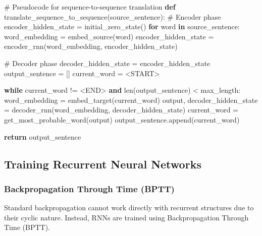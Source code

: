 \documentclass[
  letterpaper,
  DIV=11,
  numbers=noendperiod]{scrreprt}
\newenvironment{Shaded}{\begin{snugshade}}{\end{snugshade}}
\newcommand{\BuiltInTok}[1]{\textcolor[rgb]{0.00,0.23,0.31}{#1}}
\newcommand{\CommentTok}[1]{\textcolor[rgb]{0.37,0.37,0.37}{#1}}
\newcommand{\ControlFlowTok}[1]{\textcolor[rgb]{0.00,0.23,0.31}{\textbf{#1}}}
\newcommand{\KeywordTok}[1]{\textcolor[rgb]{0.00,0.23,0.31}{\textbf{#1}}}
\newcommand{\NormalTok}[1]{\textcolor[rgb]{0.00,0.23,0.31}{#1}}
\newcommand{\OperatorTok}[1]{\textcolor[rgb]{0.37,0.37,0.37}{#1}}
\newcommand{\StringTok}[1]{\textcolor[rgb]{0.13,0.47,0.30}{#1}}
\begin{document}
\begin{Shaded}
\begin{Highlighting}[]
\CommentTok{\# Pseudocode for sequence{-}to{-}sequence translation}
\KeywordTok{def}\NormalTok{ translate\_sequence\_to\_sequence(source\_sentence):}
    \CommentTok{\# Encoder phase}
\NormalTok{    encoder\_hidden\_state }\OperatorTok{=}\NormalTok{ initial\_zero\_state()}
    \ControlFlowTok{for}\NormalTok{ word }\KeywordTok{in}\NormalTok{ source\_sentence:}
\NormalTok{        word\_embedding }\OperatorTok{=}\NormalTok{ embed\_source(word)}
\NormalTok{        encoder\_hidden\_state }\OperatorTok{=}\NormalTok{ encoder\_rnn(word\_embedding, encoder\_hidden\_state)}
    
    \CommentTok{\# Decoder phase}
\NormalTok{    decoder\_hidden\_state }\OperatorTok{=}\NormalTok{ encoder\_hidden\_state}
\NormalTok{    output\_sentence }\OperatorTok{=}\NormalTok{ []}
\NormalTok{    current\_word }\OperatorTok{=} \StringTok{\textquotesingle{}\textless{}START\textgreater{}\textquotesingle{}}
    
    \ControlFlowTok{while}\NormalTok{ current\_word }\OperatorTok{!=} \StringTok{\textquotesingle{}\textless{}END\textgreater{}\textquotesingle{}} \KeywordTok{and} \BuiltInTok{len}\NormalTok{(output\_sentence) }\OperatorTok{\textless{}}\NormalTok{ max\_length:}
\NormalTok{        word\_embedding }\OperatorTok{=}\NormalTok{ embed\_target(current\_word)}
\NormalTok{        output, decoder\_hidden\_state }\OperatorTok{=}\NormalTok{ decoder\_rnn(word\_embedding, decoder\_hidden\_state)}
\NormalTok{        current\_word }\OperatorTok{=}\NormalTok{ get\_most\_probable\_word(output)}
\NormalTok{        output\_sentence.append(current\_word)}
    
    \ControlFlowTok{return}\NormalTok{ output\_sentence}
\end{Highlighting}
\end{Shaded}

\subsection{Training Recurrent Neural
Networks}\label{training-recurrent-neural-networks}

\subsubsection{Backpropagation Through Time
(BPTT)}\label{backpropagation-through-time-bptt}

Standard backpropagation cannot work directly with recurrent structures
due to their cyclic nature. Instead, RNNs are trained using
Backpropagation Through Time (BPTT).
\end{document}
